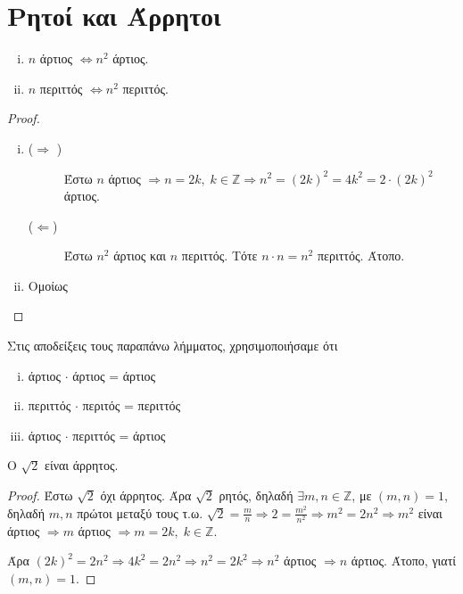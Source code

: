 \documentclass[main.tex]{subfiles}
\begin{document}
\section{Ρητοί και Άρρητοι}

\begin{lem}
\item {}
    \begin{enumerate}[i)]
        \item $n$ άρτιος $ \Leftrightarrow n^{2} $ άρτιος.
        \item $ n $ περιττός $ \Leftrightarrow n^{2} $ περιττός.
    \end{enumerate}
\end{lem}

\begin{proof}
\item {}
    \begin{enumerate}[i)]
        \item 
            \begin{description}
                \item [($ \Rightarrow $ )] 
                    Έστω $ n $ άρτιος $ \Rightarrow n =2k, \; k \in \mathbb{Z} 
                    \Rightarrow n^{2} = (2k)^{2} = 4k^{2} = 2\cdot (2k)^{2} $ άρτιος. 
                \item [($ \Leftarrow $)] Έστω $ n^{2} $ άρτιος και $n$ περιττός. Τότε 
                    $ n \cdot n = n^{2} $ περιττός. Άτοπο.
            \end{description}

        \item Ομοίως
    \end{enumerate}
\end{proof}

\begin{rem}
    Στις αποδείξεις τους παραπάνω λήμματος, χρησιμοποιήσαμε ότι 
    \begin{enumerate}[i)]
        \item άρτιος $ \cdot $ άρτιος = άρτιος
        \item περιττός $ \cdot $ περιτός = περιττός
        \item άρτιος $ \cdot $ περιττός = άρτιος
    \end{enumerate}
\end{rem}

\begin{thm}
    Ο $ \sqrt{2} $ είναι άρρητος.
\end{thm}

\begin{proof}
    Έστω $ \sqrt{2} $ όχι άρρητος. Άρα $ \sqrt{2} $ ρητός, δηλαδή $ \exists m,n 
    \in \mathbb{Z} $, με $ (m,n)=1 $, δηλαδή $ m,n $ πρώτοι μεταξύ τους
    τ.ω. $ \sqrt{2} = \frac{m}{n} \Rightarrow 2 = \frac{m^{2}}{n^{2}} \Rightarrow 
    m^{2} = 2n^{2} \Rightarrow m^{2}$ είναι άρτιος $ \Rightarrow m $ άρτιος 
    $ \Rightarrow m = 2k, \; k \in \mathbb{Z}$. 

    Άρα $ (2k)^{2} = 2n^{2} \Rightarrow 4k^{2}=2n^{2} \Rightarrow n^{2} = 2k^{2} 
    \Rightarrow n^{2} $ άρτιος $ \Rightarrow n $ άρτιος. Άτοπο, γιατί $ (m,n)=1 $.
\end{proof}
\end{document}
